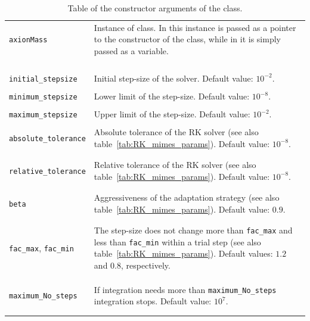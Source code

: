 \documentclass[11pt,a4paper]{article}
\begin{document}
\begin{table}[h!]
\begin{tabular}{l l}
		{\tt axionMass} &\multirow{1}{12cm}{Instance of \cppin{mimes::AxionMass<LD>} class. In \CPP this instance is passed as a pointer to the constructor
		of the \cppin{mimes::Axion<LD,Solver,Method>} class, while in \PY it is simply passed as a variable.}\\ \\  \\ \\
		\hline\\[-0.4cm]

		{\tt initial\_stepsize} &  Initial step-size of the solver. Default value: $10^{-2}$.\\ 
		\hline\\[-0.4cm]

		{\tt minimum\_stepsize} & Lower limit of the step-size. Default value:  $10^{-8}$.\\
		\hline\\[-0.4cm]

		{\tt maximum\_stepsize} & Upper limit of the step-size. Default value:  $10^{-2}$.\\
		\hline\\[-0.4cm]

		{\tt absolute\_tolerance} & \multirow{1}{12cm}{Absolute tolerance of the RK solver	(see also table~\ref{tab:RK_mimes_params}).  Default value:  $10^{-8}$.}\\\\
		\hline\\[-0.4cm]

		{\tt relative\_tolerance} & \multirow{1}{12cm}{Relative tolerance of the RK solver	(see also table~\ref{tab:RK_mimes_params}).  Default value:  $10^{-8}$.}\\\\
		\hline\\[-0.4cm]
		
		{\tt beta} & \multirow{1}{12cm}{Aggressiveness of the adaptation strategy	(see also table~\ref{tab:RK_mimes_params}).  Default value:  $0.9$.}\\\\
		\hline\\[-0.4cm]

		{\tt fac\_max}, {\tt fac\_min} &\multirow{1}{12cm}{The step-size does not change more than {\tt fac\_max} and less than {\tt fac\_min} within a trial step (see also table~\ref{tab:RK_mimes_params}). Default values: $1.2$ and $0.8$, respectively.} \\ \\ \\ 
		\hline\\[-0.4cm]
		
		{\tt maximum\_No\_steps} & \multirow{1}{12cm}{If integration needs more than {\tt maximum\_No\_steps} integration stops. Default value: $10^7$.}\\\\
		\hline\\[-0.4cm]
	\end{tabular}
	\caption{Table of the constructor arguments of the  class.}
	\label{tab:AxionSolve-input}
\end{table}
\end{document}
